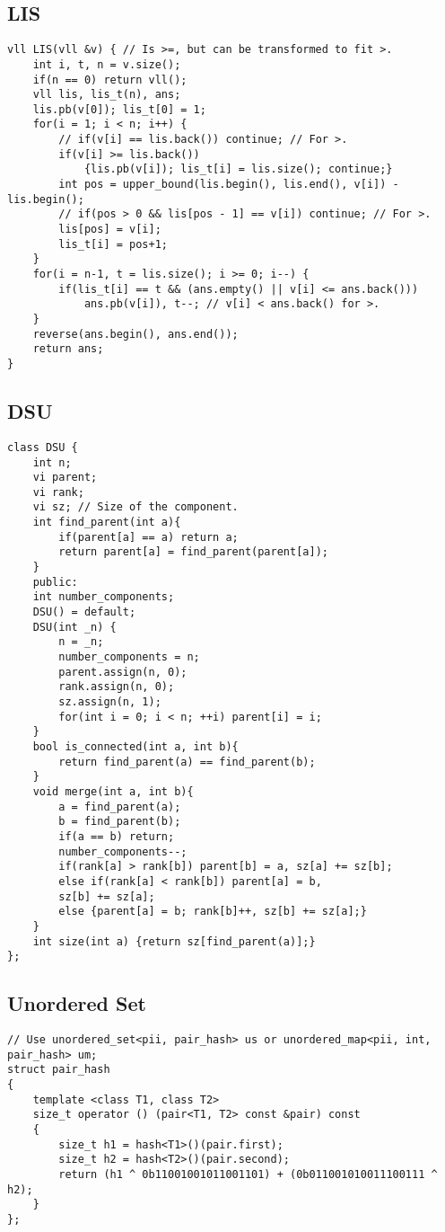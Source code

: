 \documentclass[a4paper]{article}
\begin{document}
\subsection*{LIS}
\begin{verbatim}
vll LIS(vll &v) { // Is >=, but can be transformed to fit >.
    int i, t, n = v.size();
    if(n == 0) return vll();
    vll lis, lis_t(n), ans;
    lis.pb(v[0]); lis_t[0] = 1;
    for(i = 1; i < n; i++) {
        // if(v[i] == lis.back()) continue; // For >.
        if(v[i] >= lis.back())
            {lis.pb(v[i]); lis_t[i] = lis.size(); continue;}
        int pos = upper_bound(lis.begin(), lis.end(), v[i]) - lis.begin();
        // if(pos > 0 && lis[pos - 1] == v[i]) continue; // For >.
        lis[pos] = v[i];
        lis_t[i] = pos+1;
    }
    for(i = n-1, t = lis.size(); i >= 0; i--) {
        if(lis_t[i] == t && (ans.empty() || v[i] <= ans.back()))
            ans.pb(v[i]), t--; // v[i] < ans.back() for >.
    }
    reverse(ans.begin(), ans.end());
    return ans;
}
\end{verbatim}
\subsection*{DSU}
\begin{multicols}{2}
\begin{verbatim}
class DSU {
    int n;
    vi parent;
    vi rank;
    vi sz; // Size of the component.
    int find_parent(int a){
        if(parent[a] == a) return a;
        return parent[a] = find_parent(parent[a]);
    }
    public:
    int number_components;
    DSU() = default;
    DSU(int _n) {
        n = _n;
        number_components = n;
        parent.assign(n, 0);
        rank.assign(n, 0);
        sz.assign(n, 1);
        for(int i = 0; i < n; ++i) parent[i] = i;
    }
    bool is_connected(int a, int b){
        return find_parent(a) == find_parent(b);
    }
    void merge(int a, int b){
        a = find_parent(a);
        b = find_parent(b);
        if(a == b) return;
        number_components--;
        if(rank[a] > rank[b]) parent[b] = a, sz[a] += sz[b];
        else if(rank[a] < rank[b]) parent[a] = b,
        sz[b] += sz[a];
        else {parent[a] = b; rank[b]++, sz[b] += sz[a];}
    }
    int size(int a) {return sz[find_parent(a)];}
};
\end{verbatim}
\end{multicols}
\subsection*{Unordered Set}
\begin{verbatim}
// Use unordered_set<pii, pair_hash> us or unordered_map<pii, int, pair_hash> um;
struct pair_hash
{
    template <class T1, class T2>
    size_t operator () (pair<T1, T2> const &pair) const
    {
        size_t h1 = hash<T1>()(pair.first);
        size_t h2 = hash<T2>()(pair.second);
        return (h1 ^ 0b11001001011001101) + (0b011001010011100111 ^ h2);
    }
};
\end{verbatim}
\end{document}
